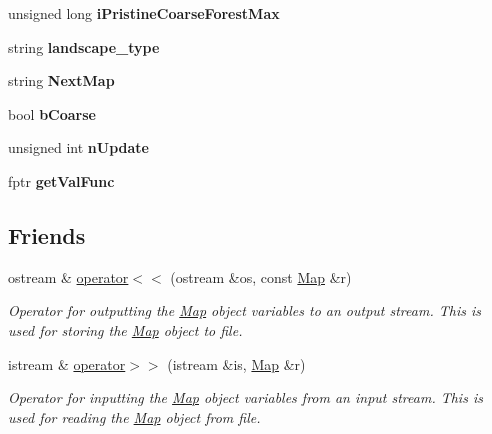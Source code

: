 \begin{DoxyCompactItemize}
\item 
unsigned long {\bfseries i\+Pristine\+Coarse\+Forest\+Max}\hypertarget{class_map_a65de79734ab3072d1ebab055e4eae685}{}\label{class_map_a65de79734ab3072d1ebab055e4eae685}

\item 
string {\bfseries landscape\+\_\+type}\hypertarget{class_map_a81e886ea2c2168c3d8b33a3e9502901a}{}\label{class_map_a81e886ea2c2168c3d8b33a3e9502901a}

\item 
string {\bfseries Next\+Map}\hypertarget{class_map_a8346e76eb734528fc6cffc2170517c3d}{}\label{class_map_a8346e76eb734528fc6cffc2170517c3d}

\item 
bool {\bfseries b\+Coarse}\hypertarget{class_map_aa2478803a3e80e91042d054de88e9ee1}{}\label{class_map_aa2478803a3e80e91042d054de88e9ee1}

\item 
unsigned int {\bfseries n\+Update}\hypertarget{class_map_ae91de9d71b1aa841d73adcacaf1777d8}{}\label{class_map_ae91de9d71b1aa841d73adcacaf1777d8}

\item 
fptr {\bfseries get\+Val\+Func}\hypertarget{class_map_af2ed0369327fb4dbe0e7f7fc5088920d}{}\label{class_map_af2ed0369327fb4dbe0e7f7fc5088920d}

\end{DoxyCompactItemize}
\subsection*{Friends}
\begin{DoxyCompactItemize}
\item 
ostream \& \hyperlink{class_map_a0da37af2cd547fa045e06a2da3c1039f}{operator$<$$<$} (ostream \&os, const \hyperlink{class_map}{Map} \&r)
\begin{DoxyCompactList}\small\item\em Operator for outputting the \hyperlink{class_map}{Map} object variables to an output stream. This is used for storing the \hyperlink{class_map}{Map} object to file. \end{DoxyCompactList}\item 
istream \& \hyperlink{class_map_a480da4c3f474c0af7eacdde650546dc1}{operator$>$$>$} (istream \&is, \hyperlink{class_map}{Map} \&r)
\begin{DoxyCompactList}\small\item\em Operator for inputting the \hyperlink{class_map}{Map} object variables from an input stream. This is used for reading the \hyperlink{class_map}{Map} object from file. \end{DoxyCompactList}\end{DoxyCompactItemize}


